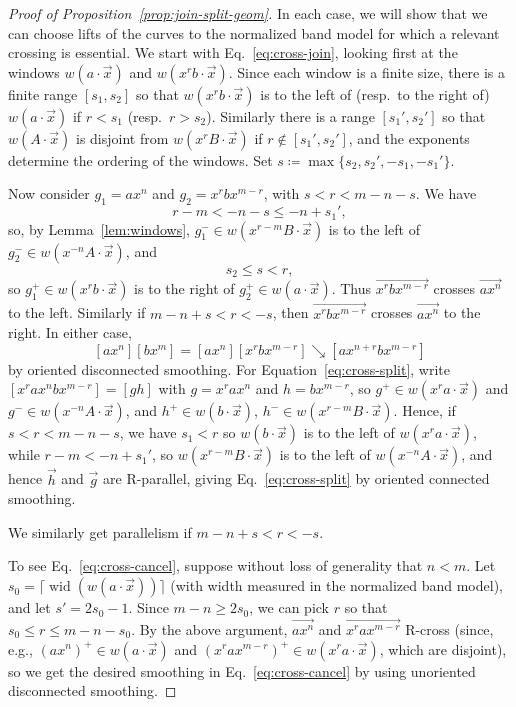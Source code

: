 \documentclass[11pt]{amsart}
\newcommand{\ora}[1]{\overrightarrow{#1}}
\numberwithin{equation}{section}
\numberwithin{figure}{section}
\theoremstyle{definition}
\theoremstyle{plain}
\newcommand{\wid}{\operatorname{wid}}
\newcommand{\reducesto}{\mathrel{\searrow}}
\begin{document}
\begin{proof}[Proof of Proposition~\ref{prop:join-split-geom}]
  In each case, we will show that we can choose lifts of the curves to
  the normalized band model for which a
  relevant crossing is essential. We start with
  Eq.~\eqref{eq:cross-join}, looking first at the windows $w(a\cdot
  \ora{x})$ and $w(x^rb\cdot\ora{x})$.
  Since each window is a
  finite size, there is a finite range $[s_1,s_2]$ so that $w(x^rb\cdot\ora{x})$
  is to the left of (resp.~to the right of) $w(a\cdot\ora{x})$ if $r < s_1$
  (resp.\ $r > s_2$).
  Similarly there
  is a range $[s_1',s_2']$ so that $w(A\cdot\ora{x})$ is disjoint from
  $w(x^rB\cdot\ora{x})$ if $r \notin [s_1',s_2']$, and the exponents determine the
  ordering of the windows. Set
  $s \coloneqq \max\{s_2,s_2',-s_1,-s_1'\}$.

  Now consider
  $g_1 = ax^n$ and $g_2 = x^rbx^{m-r}$, with $s < r < m-n-s$. We have
  \[
    r-m < -n-s \le -n+s_1',
  \]
  so, by Lemma~\ref{lem:windows}, $g_1^- \in w(x^{r-m}B\cdot\ora{x})$
  is to the left of $g_2^- \in w(x^{-n}A\cdot\ora{x})$, and
  \[
    s_2 \le s < r,
  \]
  so $g_1^+ \in w(x^rb\cdot\ora{x})$ is to the right of $g_2^+ \in
  w(a\cdot\ora{x})$. Thus
  $\ora{x^rbx^{m-r}}$ crosses $\ora{ax^n}$ to the left. Similarly if
  $m-n+s < r < -s$, then $\ora{x^rbx^{m-r}}$ crosses $\ora{ax^n}$ to the
  right. In either case,
  \[
    [ax^n][bx^m] = [ax^n][x^r bx^{m-r}] \reducesto [ax^{n+r}bx^{m-r}]
  \]
  by oriented disconnected smoothing.
  For Equation~\eqref{eq:cross-split}, write $[x^r ax^n bx^{m-r}]=[gh]$ with
  $g=x^r ax^n$ and $h=bx^{m-r}$, 
  so $g^+ \in w(x^ra\cdot\ora{x})$ and $g^- \in w(x^{-n}A \cdot \ora{x})$, and $h^+ \in w(b \cdot \ora{x})$, $h^- \in w(x^{r-m} B \cdot \ora{x})$.
  Hence, if $s < r < m-n-s$, we have $s_1 < r$
  so $w(b\cdot\ora{x})$ is to the left of $w(x^r a\cdot\ora{x})$,
  while $r-m < -n+s_1'$, so $w(x^{r-m}B \cdot\ora{x})$ is to the left
  of $w(x^{-n}A\cdot\ora{x})$, and hence $\ora{h}$ and $\ora{g}$ are R-parallel, giving Eq.~\eqref{eq:cross-split} by oriented connected smoothing.
  
  We similarly get parallelism if $m-n+s < r < -s$.

  To see Eq.~\eqref{eq:cross-cancel}, suppose without loss of generality
  that $n < m$. Let $s_0 = \lceil \wid(w(a\cdot\ora{x})) \rceil$
  (with width measured in the normalized band model),
  and
  let $s' = 2s_0 - 1$. Since $m-n \ge 2s_0$, we can pick $r$ so that
  $s_0 \le r \le m-n-s_0$. By the above argument, $\ora{ax^n}$ and
  $\ora{x^rax^{m-r}}$ R-cross (since, e.g., $(ax^n)^+ \in w(a\cdot\ora{x})$ and
  $(x^rax^{m-r})^+ \in w(x^r a\cdot\ora{x})$, which are disjoint), so we get the
  desired smoothing in Eq.~\eqref{eq:cross-cancel} by using unoriented
  disconnected smoothing.


\end{proof}
\end{document}
